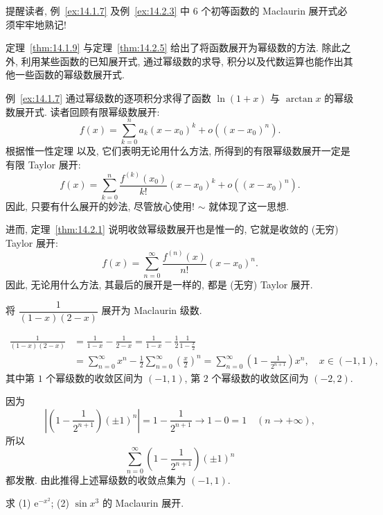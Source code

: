 提醒读者, 例~\ref{ex:14.1.7} 及例~\ref{ex:14.2.3} 中 $6$ 个初等函数的 Maclaurin 展开式必须牢牢地熟记!

定理~\ref{thm:14.1.9} 与定理~\ref{thm:14.2.5} 给出了将函数展开为幂级数的方法. 除此之外, 利用某些函数的已知展开式, 通过幂级数的求导, 积分以及代数运算也能作出其他一些函数的幂级数展开式.

例~\ref{ex:14.1.7} 通过幂级数的逐项积分求得了函数 $\ln(1+x)$ 与 $\arctan x$ 的幂级数展开式. 读者回顾有限幂级数展开:
\[
  f(x)=\sum_{k=0}^{n}a_{k}(x-x_{0})^{k}+o((x-x_{0})^{n}).
\]
根据惟一性定理 以及, 它们表明无论用什么方法, 所得到的有限幂级数展开一定是有限 Taylor 展开:
\[
  f(x)=\sum_{k=0}^{n}\frac{f^{(k)}(x_{0})}{k!}(x-x_{0})^{k}+o((x-x_{0})^{n}).
\]
因此, 只要有什么展开的妙法, 尽管放心使用! $\sim$ 就体现了这一思想.

进而, 定理~\ref{thm:14.2.1} 说明收敛幂级数展开也是惟一的, 它就是收敛的 (无穷) Taylor 展开:
\[
  f(x)=\sum_{n=0}^{\infty}\frac{f^{(n)}(x)}{n!}(x-x_{0})^{n}.
\]
因此, 无论用什么方法, 其最后的展开是一样的, 都是 (无穷) Taylor 展开.



\begin{example}\label{ex:14.2.4}
将 $\dfrac{1}{(1-x)(2-x)}$ 展开为 Maclaurin 级数.
\end{example}

\[
  \begin{aligned}
    \frac{1}{(1-x)(2-x)}&=\frac{1}{1-x}-\frac{1}{2-x}=\frac{1}{1-x}-\frac{1}{2}\frac{1}{1-\frac{x}{2}}\\
    &=\sum_{n=0}^{\infty}x^{n}-\frac{1}{2}\sum_{n=0}^{\infty}\left(\frac{x}{2}\right)^{n}=\sum_{n=0}^{\infty}\left(1-\frac{1}{2^{n+1}}\right)x^{n},\quad x\in(-1,1),
  \end{aligned}
\]
其中第 $1$ 个幂级数的收敛区间为 $(-1,1)$, 第 $2$ 个幂级数的收敛区间为 $(-2,2)$.

因为
\[
  \left|\left(1-\frac{1}{2^{n+1}}\right)(\pm1)^{n}\right|=1-\frac{1}{2^{n+1}}\to1-0=1\quad(n\to+\infty),
\]
所以
\[
  \sum_{n=0}^{\infty}\left(1-\frac{1}{2^{n+1}}\right)(\pm1)^{n}
\]
都发散. 由此推得上述幂级数的收敛点集为 $(-1,1)$.

\begin{example}\label{ex:14.2.5}
求 (1) $\mathrm{e}^{-x^{2}}$; (2) $\sin x^{3}$ 的 Maclaurin 展开.
\end{example}

